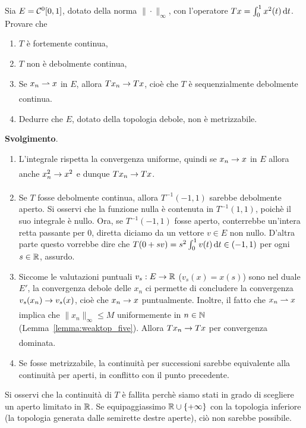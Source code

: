 \begin{exercise}
	Sia $E=\mathcal{C}^0[0,1]$, dotato della norma $\|\cdot\|_\infty$, con l'operatore $Tx = \int_0^1 x^2(t)\,\mathrm{d}t$. Provare che
	\begin{enumerate}
		\item $T$ è fortemente continua,
		\item $T$ non è debolmente continua,
		\item Se $x_n \rightharpoonup x$ in $E$, allora $Tx_n \underset{{}}{\rightarrow} Tx$, cioè che $T$ è sequenzialmente debolmente continua.
		\item Dedurre che $E$, dotato della topologia debole, non è metrizzabile.
	\end{enumerate}

	\textbf{Svolgimento}.
	\begin{enumerate}
		\item L'integrale rispetta la convergenza uniforme, quindi se $x_n \underset{{}}{\rightarrow} x$ in $E$ allora anche $x^2_n \underset{{}}{\rightarrow} x^2$ e dunque $Tx_n \underset{{}}{\rightarrow} Tx$.
		\item Se $T$ fosse debolmente continua, allora $T^{-1}(-1,1)$ sarebbe debolmente aperto.
		Si osservi che la funzione nulla è contenuta in $T^{-1}(1,1)$, poichè il suo integrale è nullo.
		Ora, se $T^{-1}(-1,1)$ fosse aperto, conterrebbe un'intera retta passante per $0$, diretta diciamo da un vettore $v \in E$ non nullo.
		D'altra parte questo vorrebbe dire che $T(0+sv) = s^2 \int_0^1 v(t)\,\mathrm{d}t \in (-1,1)$ per ogni $s \in \mathbb{R}$, assurdo.
		\item Siccome le valutazioni puntuali $v_s : E \to \mathbb{R}$ ($v_s(x) = x(s)$) sono nel duale $E'$, la convergenza debole delle $x_n$ ci permette di concludere la convergenza $v_s(x_n) \underset{{}}{\rightarrow} v_s(x)$, cioè che $x_n \underset{{}}{\rightarrow} x$ puntualmente.
		Inoltre, il fatto che $x_n \rightharpoonup x$ implica che $\|x_n\|_\infty \leq M$ uniformemente in $n \in \mathbb{N}$ (Lemma~\ref{lemma:weaktop_five}).
		Allora $Tx_n \underset{{}}{\rightarrow} Tx$ per convergenza dominata.
		\item Se fosse metrizzabile, la continuità per successioni sarebbe equivalente alla continuità per aperti, in conflitto con il punto precedente.
	\end{enumerate}
\end{exercise}

Si osservi che la continuità di $T$ è fallita perchè siamo stati in grado di scegliere un aperto limitato in $\mathbb{R}$. Se equipaggiassimo $\mathbb{R} \cup \{+\infty\}$ con la topologia inferiore (la topologia generata dalle semirette destre aperte), ciò non sarebbe possibile.


